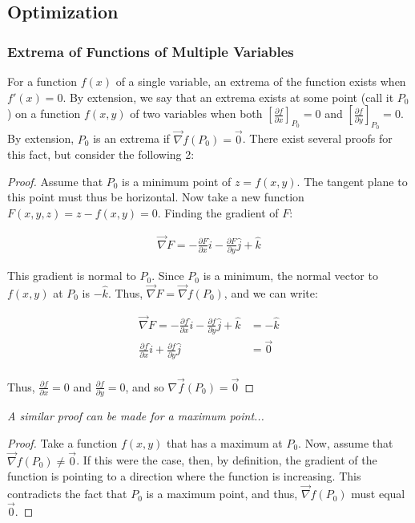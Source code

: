 \documentclass[12pt]{article}
\begin{document}
{\subsection{Optimization}

\subsubsection{Extrema of Functions of Multiple Variables}

\renewcommand\qedsymbol{$\blacksquare$}

For a function $f(x)$ of a single variable, an extrema of the function exists when $f'(x) = 0$. By extension, we say that an extrema exists at some point (call it $P_0$) on a function $f(x,y)$ of two variables when both $[\frac{\partial f}{\partial x}]_{P_0} = 0$ and $[\frac{\partial f}{\partial y}]_{P_0} = 0$. By extension, $P_0$ is an extrema if $\vec{\nabla} f(P_0) = \vec{0}$. There exist several proofs for this fact, but consider the following 2:

\begin{proof}
    Assume that $P_0$ is a minimum point of $z=f(x,y)$. The tangent plane to this point must thus be horizontal. Now take a new function $F(x,y,z) = z-f(x,y) = 0$. Finding the gradient of $F$:

    \begin{align*}
        \vec{\nabla}F = -\frac{\partial F}{\partial x}\hat{i} - \frac{\partial F}{\partial y}\hat{j} + \hat{k}
    \end{align*}

    This gradient is normal to $P_0$. Since $P_0$ is a minimum, the normal vector to $f(x,y)$ at $P_0$ is $-\hat{k}$. Thus, $\vec{\nabla}F = \vec{\nabla}f(P_0)$, and we can write:

    \begin{align*}
        \vec{\nabla}F = -\frac{\partial f}{\partial x}\hat{i} - \frac{\partial f}{\partial y}\hat{j} + \hat{k} &= -\hat{k}\\
        \frac{\partial f}{\partial x}\hat{i} + \frac{\partial f}{\partial y}\hat{j} &= \vec{0}\\
    \end{align*}

    Thus, $\frac{\partial f}{\partial x} = 0$ and $\frac{\partial f}{\partial y} = 0$, and so $\nabla \vec{f} (P_0) = \vec{0}$ 
\end{proof}

\textit{A similar proof can be made for a maximum point...}
\begin{proof}
    Take a function $f(x,y)$ that has a maximum at $P_0$. Now, assume that $\vec{\nabla}f(P_0) \neq \vec{0}$. If this were the case, then, by definition, the gradient of the function is pointing to a direction where the function is increasing. This contradicts the fact that $P_0$ is a maximum point, and thus, $\vec{\nabla}f(P_0)$ must equal $\vec{0}$.
\end{proof}

}
\end{document}
